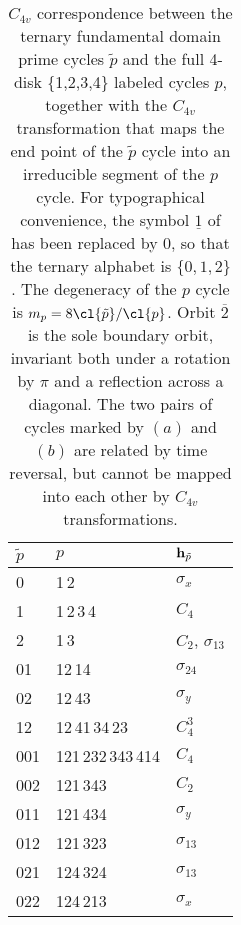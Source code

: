     \PublicPrivate{
    }{%
    \PC{2009-01-18}{redrew FigSrc/sune/xfig/ .
    dynamics.fig is now renamed c4vRelative.fig,
    see \reffig{apeDscr:c4vRelative}. Try to find
    fig2.eps?
     }
%
\FIG{
\texttt{[image: c4vRelative]}
}{}{
Reduced, fundamental domain symbolic dynamics for
four disks on a square.
}{apeDscr:c4vRelative}
%
    }%

\begin{table}
\caption[]{\small
$C_{4v}$ correspondence between the ternary
fundamental
domain prime cycles $\tilde{p}$ and the full 4-disk \{1,2,3,4\}
labeled cycles ${p}$,
together with the $C_{4v}$ transformation that maps the end point of the
$\tilde{p}$ cycle into an irreducible segment of the $p$ cycle.
For typographical convenience, the symbol $\underline{1}$
of  has been replaced
by $0$, so that the ternary alphabet is $\{0,1,2\}$. The degeneracy
of the $p$ cycle is $m_p=8 \cl{\tilde{p}}/\cl{p}$.
Orbit $\overline{2}$ is the sole boundary orbit,
invariant both under a rotation by $\pi$
and a reflection across a diagonal. The two pairs of cycles
marked by $(a)$ and $(b)$ are related by time reversal, but cannot
be mapped into each other by $C_{4v}$ transformations.}
{\small
\begin{tabular}{lll}
$\tilde{p}$ & ${p}$  & ${\bf h}_{\tilde{p}}$ \\
\hline
0  &  1\,2  &  ${\sigma}_x$ \\
1  &  1\,2\,3\,4  &  $C_4$ \\
2  &  1\,3  &  $C_2$, ${\sigma}_{13}$ \\
01  &  12\,14  &  ${\sigma}_{24}$ \\
02  &  12\,43  &  ${\sigma}_y$ \\
12  &  12\,41\,34\,23  &  $C_4^3$ \\
001  &  121\,232\,343\,414  &  $C_4$ \\
002  &  121\,343  &  $C_2$ \\
011  &  121\,434  &  ${\sigma}_y$ \\
012  &  121\,323  &  ${\sigma}_{13}$ \\
021  &  124\,324  &  ${\sigma}_{13}$ \\
022  &  124\,213  &  ${\sigma}_x$ \\

\end{tabular}}
\end{table}
